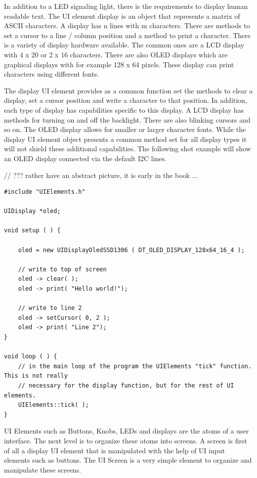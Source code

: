 
In addition to a LED signaling light, there is the requirements to display human readable text. The UI element display is an object that represents a matrix of ASCII characters. A display has n lines with m characters. There are methods to set a cursor to a line / column position and a method to print a character. There is a variety of display hardware available. The common ones are a LCD display with 4 x 20 or 2 x 16 characters. There are also OLED displays which are graphical displays with for example 128 x 64 pixels. These display can print characters using different fonts.

The display UI element provides as a common function set the methods to clear a display, set a cursor position and write a character to that position. In addition, each type of display has capabilities specific to this display. A LCD display has methods for turning on and off the backlight. There are also blinking cursors and so on. The OLED display allows for smaller or larger character fonts. While the display UI element object presents a common method set for all display types it will not shield these additional capabilities. The following shot example will show an OLED display connected via the default I2C lines.

// ??? rather have an abstract picture, it is early in the book ...


\lstset{language=c++, style=codesnippetstyle}
\begin{lstlisting}
#include "UIElements.h"

UIDisplay *oled;

void setup ( ) {

	oled = new UIDisplayOledSSD1306 ( DT_OLED_DISPLAY_128x64_16_4 );

	// write to top of screen
	oled -> clear( );
	oled -> print( "Hello world!");

	// write to line 2
	oled -> setCursor( 0, 2 );
	oled -> print( "Line 2");
}

void loop ( ) {
	// in the main loop of the program the UIElements "tick" function. This is not really
	// necessary for the display function, but for the rest of UI elements.
	UIElements::tick( );
}
\end{lstlisting}
\FloatBarrier


UI Elements such as Buttons, Knobs, LEDs and displays are the atoms of a user interface. The next level is to organize these atoms into screens. A screen is first of all a display UI element that is manipulated with the help of UI input elements such as buttons. The UI Screen is a very simple element to organize and manipulate these screens.

